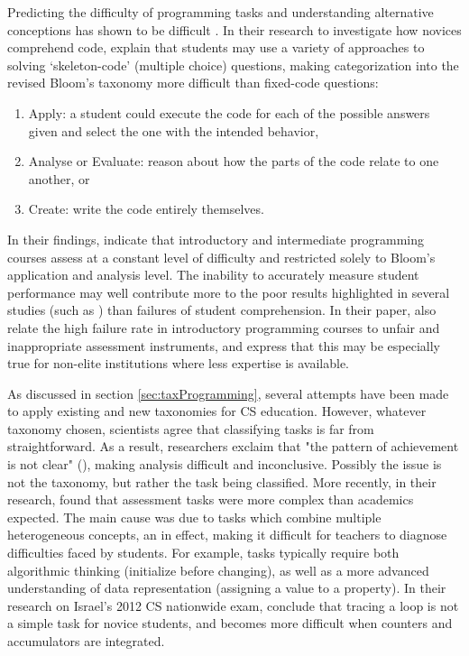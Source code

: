 Predicting the difficulty of programming tasks and understanding alternative conceptions has shown to be difficult \cite{Lonati2017Bebras}. In their research to investigate how novices comprehend code,  explain that students may use a variety of approaches to solving ‘skeleton-code’ (multiple choice) questions, making categorization into the revised Bloom’s taxonomy more difficult than fixed-code questions:
\begin{enumerate}
\item Apply: a student could execute the code for each of the possible answers given and select the one with the intended behavior,
\item Analyse or Evaluate: reason about how the parts of the code relate to one another, or
\item Create: write the code entirely themselves.
\end{enumerate}
In their findings,  indicate that introductory and intermediate programming courses assess at a constant level of difficulty and restricted solely to Bloom’s application and analysis level. The inability to accurately measure student performance may well contribute more to the poor results highlighted in several studies (such as ) than failures of student comprehension\cite{2010TewGuzdial}. In their paper,  also relate the high failure rate in introductory programming courses to unfair and inappropriate assessment instruments, and express that this may be especially true for non-elite institutions where less expertise is available.

As discussed in section \ref{sec:taxProgramming}, several attempts have been made to apply existing and new taxonomies for CS education. However, whatever taxonomy chosen, scientists agree that classifying tasks is far from straightforward. As a result, researchers exclaim that "the pattern of achievement is not clear" (\cite{ZurBargury2013}), making analysis difficult and inconclusive. Possibly the issue is not the taxonomy, but rather the task being classified. More recently, in their research,  found that assessment tasks were more complex than academics expected. The main cause was due to tasks which combine multiple heterogeneous concepts, an in effect, making it difficult for teachers to diagnose difficulties faced by students. For example, tasks typically require both algorithmic thinking (initialize before changing), as well as a more advanced understanding of data representation (assigning a value to a property)\cite{Seiter2013}. In their research on Israel's 2012 CS nationwide exam,  conclude that tracing a loop is not a simple task for novice students, and becomes more difficult when counters and accumulators are integrated.


